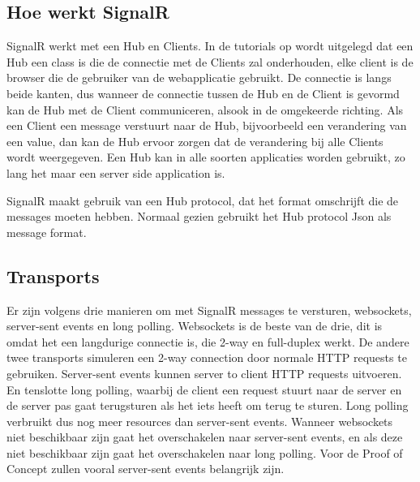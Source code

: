 \subsection{Hoe werkt SignalR}
SignalR werkt met een Hub en Clients. In de tutorials op \textcite{PluralsightSignalR} wordt uitgelegd dat een Hub een class is die de connectie met de Clients zal onderhouden, elke client is de browser die de gebruiker van de webapplicatie gebruikt. De connectie is langs beide kanten, dus wanneer de connectie tussen de Hub en de Client is gevormd kan de Hub met de Client communiceren, alsook in de omgekeerde richting. Als een Client een message verstuurt naar de Hub, bijvoorbeeld een verandering van een value, dan kan de Hub ervoor zorgen dat de verandering bij alle Clients wordt weergegeven. Een Hub kan in alle soorten applicaties worden gebruikt, zo lang het maar een server side application is. 

SignalR maakt gebruik van een Hub protocol, dat het format omschrijft die de messages moeten hebben. Normaal gezien gebruikt het Hub protocol Json als message format.

\subsection{Transports}
Er zijn volgens \textcite{PluralsightSignalR} drie manieren om met SignalR messages te versturen, websockets, server-sent events en long polling. Websockets is de beste van de drie, dit is omdat het een langdurige connectie is, die 2-way en full-duplex werkt. De andere twee transports simuleren een 2-way connection door normale HTTP requests te gebruiken. Server-sent events kunnen server to client HTTP requests uitvoeren. En tenslotte long polling, waarbij de client een request stuurt naar de server en de server pas gaat terugsturen als het iets heeft om terug te sturen. Long polling verbruikt dus nog meer resources dan server-sent events. Wanneer websockets niet beschikbaar zijn gaat het overschakelen naar server-sent events, en als deze niet beschikbaar zijn gaat het overschakelen naar long polling.
Voor de Proof of Concept zullen vooral server-sent events belangrijk zijn. 